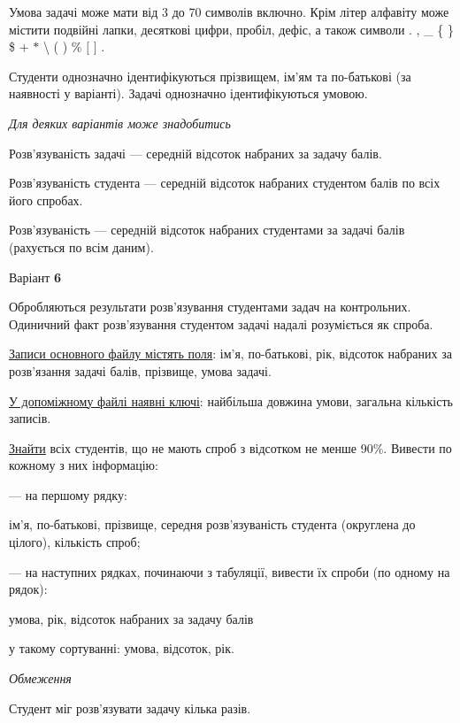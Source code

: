 \documentclass[11pt, ukrainian]{article}
\begin{document}
Умова задачі може мати від 3 до 70 символів включно.
Крім літер алфавіту може містити подвійні лапки, десяткові цифри, пробіл, дефіс,
а також символи . , \_ \{ \} \$ $+$ $*$ {\textbackslash} ( ) \% $[$ $]$ .

Студенти однозначно ідентифікуються прізвищем, ім’ям та по-батькові (за наявності у варіанті).
Задачі однозначно ідентифікуються умовою.

\bigskip\textit{Для деяких варіантів може знадобитись}

Розв'язуваність задачі --- середній відсоток набраних за задачу балів.

Розв'язуваність студента --- середній відсоток набраних студентом балів по всіх його спробах.

Розв'язуваність --- середній відсоток набраних студентами за задачі балів (рахується по всім даним).


\par
\newpage
{\center Варіант  \No \textbf { 6 }\par}
\bigskip
Обробляються результати розв’язування студентами задач на контрольних.
Одиничний факт роз\-в’я\-зу\-вання студентом задачі надалі розуміється як спроба.

\underline{Записи основного файлу містять поля}: ім’я, по-батькові, рік, відсоток набраних за розв’язання задачі балів, прізвище, умова задачі.

\underline{У допоміжному файлі наявні ключі}: найбільша довжина умови, загальна кількість записів.

\underline{Знайти} всіх студентів, що не мають спроб з відсотком не менше 90\%. Вивести по кожному з них інформацію:\par
{\noindent}--- на першому рядку:\par
ім’я, по-батькові, прізвище, середня розв’язуваність студента (округлена до цілого), кількість спроб;

{\noindent}--- на наступних рядках, починаючи з табуляції, вивести їх спроби (по одному на рядок):\par
умова, рік, відсоток набраних за задачу балів

{\noindent}у такому сортуванні: умова, відсоток, рік.


\bigskip\textit{Обмеження}

Студент міг розв’язувати задачу кілька разів.
\end{document}
